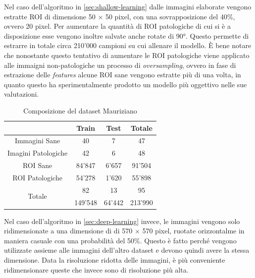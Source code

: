 Nel caso dell'algoritmo in \ref{sec:shallow-learning} dalle immagini
elaborate vengono estratte ROI di dimensione 50 $\times$ 50 pixel,
con una sovrapposizione del 40\%, ovvero 20 pixel.
Per aumentare la quantità di ROI patologiche di cui si è a disposizione
esse vengono inoltre salvate anche rotate di 90°.
Questo permette di estrarre in totale circa 210'000 campioni su cui allenare
il modello.
È bene notare che nonostante questo tentativo di aumentare le ROI
patologiche viene applicato alle immaigni non-patologiche un processo
di {\it oversampling}, ovvero in fase di estrazione delle {\it features}
alcune ROI sane vengono estratte più di una volta, in quanto questo
ha sperimentalmente prodotto un modello più oggettivo nelle sue
valutazioni.

\begin{table}
    \center
    \begin{tabular}[h]{||c||c|c|c||}
        \hline
        & Train & Test & Totale \\
        \hline
        Immagini Sane & 40 & 7 & 47 \\
        \hline
        Imagini Patologiche & 42 & 6 & 48 \\
        \hline
        ROI Sane & 84'847 & 6'657 & 91'504 \\
        \hline
        ROI Patologiche & 54'278 & 1'620 & 55'898\\
        \hline
        \hline
        \multirow{2}{*}{Totale} & 82 & 13 & 95 \\ \cline{2-4}
        & 149'548 & 64'442 & 213'990 \\
        \hline
    \end{tabular}
    \caption{\label{tab:mauriziano}Composizione del dataset Mauriziano}
\end{table}

Nel caso dell'algoritmo in \ref{sec:deep-learning} invece, le immagini
vengono solo ridimensionate a una dimensione di di 570 $\times$ 570 pixel,
ruotate orizzontalme in maniera casuale con una probabilità del 50\%.
Questo è fatto perché vengono utilizzate assieme alle immagini
dell'altro dataset e devono quindi avere la stessa dimensione.
Data la risoluzione ridotta delle immagini, è più conveniente
ridimensionare queste che invece sono di risoluzione più alta.

